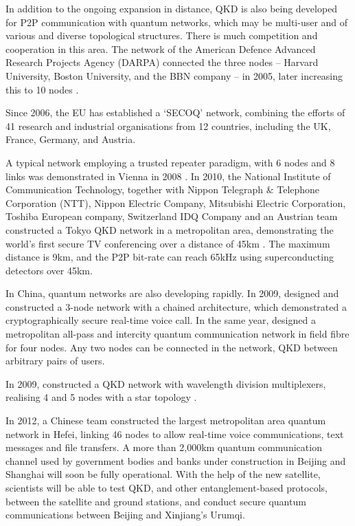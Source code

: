 In addition to the ongoing expansion in distance, QKD is also being developed for P2P communication with quantum networks, which may be multi-user and of various and diverse topological structures. There is much competition and cooperation in this area. The network of the American Defence Advanced Research Projects Agency (DARPA) connected the three nodes -- Harvard University, Boston University, and the BBN company -- in 2005, later increasing this to 10 nodes \cite{bib:QCC_2006_83}.

Since 2006, the EU has established a `SECOQ' network, combining the efforts of 41 research and industrial organisations from 12 countries, including the UK, France, Germany, and Austria.

A typical network employing a trusted repeater paradigm, with 6 nodes and 8 links was demonstrated in Vienna in 2008 \cite{bib:NJP_11_075001}. In 2010, the National Institute of Communication Technology, together with Nippon Telegraph \& Telephone Corporation (NTT), Nippon Electric Company, Mitsubishi Electric Corporation, Toshiba European company, Switzerland IDQ Company and an Austrian team constructed a Tokyo QKD network in a metropolitan area, demonstrating the world's first secure TV conferencing over a distance of 45km \cite{bib:OExp_19_10387}. The maximum distance is 9km, and the P2P bit-rate can reach 65kHz using superconducting detectors over 45km. 

In China, quantum networks are also developing rapidly. In 2009, \cite{bib:OpEx17_6540} designed and constructed a 3-node network with a chained architecture, which demonstrated a cryptographically secure real-time voice call. In the same year, \cite{bib:OpEx_18_27217} designed a metropolitan all-pass and intercity quantum communication network in field fibre  for four nodes. Any two nodes can be connected in the network, QKD between arbitrary pairs of users.

In 2009, \cite{bib:PLA_372_3957} constructed a QKD network with wavelength division multiplexers, realising 4 and 5 nodes with a star topology \cite{bib:OL_35_2454}.

In 2012, a Chinese team constructed the largest metropolitan area quantum network in Hefei, linking 46 nodes to allow real-time voice communications, text messages and file transfers. A more than 2,000km quantum communication channel used by government bodies and banks under construction in Beijing and Shanghai will soon be fully operational. With the help of the new satellite, scientists will be able to test QKD, and other entanglement-based protocols, between the satellite and ground stations, and conduct secure quantum communications between Beijing and Xinjiang's Urumqi.

